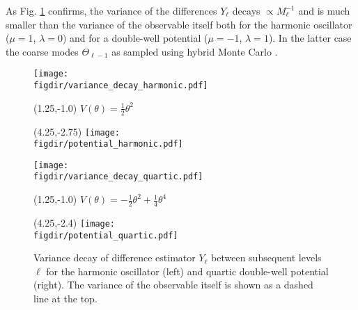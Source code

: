 \documentclass[11pt]{article}
\newcommand{\figdir}{./figures/}
\begin{document}
As Fig. \ref{eqn:quantum_results} confirms, the variance of the differences $Y_\ell$ decays $\propto M_\ell^{-1}$ and is much smaller than the variance of the observable itself both for the harmonic oscillator ($\mu=1$, $\lambda=0$) and for a double-well potential ($\mu=-1$, $\lambda=1$). In the latter case the coarse modes $\Theta_{\ell-1}$ as sampled using hybrid Monte Carlo \cite{Duane1987}.
\begin{figure}
  \begin{center}
  \begin{minipage}{0.45\linewidth}
    \texttt{[image: \\figdir/variance\_decay\_harmonic.pdf]}
    \begin{textblock}{4.0}(1.25,-1.0)
      $V(\theta)=\frac{1}{2}\theta^2$
    \end{textblock}
    \begin{textblock}{4.0}(4.25,-2.75)
      \texttt{[image: \\figdir/potential\_harmonic.pdf]}
    \end{textblock}
  \end{minipage}
  \hfill
  \begin{minipage}{0.45\linewidth}
    \texttt{[image: \\figdir/variance\_decay\_quartic.pdf]}
    \begin{textblock}{4.0}(1.25,-1.0)
      $V(\theta)=-\frac{1}{2}\theta^2+\frac{1}{4}\theta^4$
    \end{textblock}
    \begin{textblock}{4.0}(4.25,-2.4)
      \texttt{[image: \\figdir/potential\_quartic.pdf]}
    \end{textblock}
  \end{minipage}
  \caption{Variance decay of difference estimator $Y_\ell$ between subsequent levels $\ell$ for the harmonic oscillator (left) and quartic double-well potential (right). The variance of the observable itself is shown as a dashed line at the top.}
  \label{eqn:quantum_results}
  \end{center}
\end{figure}
\end{document}
